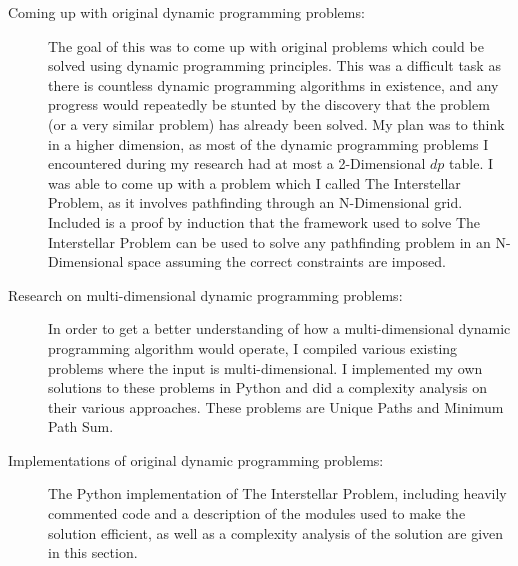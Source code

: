 \begin{description}
    \item[Coming up with original dynamic programming problems:]
    The goal of this was to come up with original problems which could be solved using dynamic programming principles.
    This was a difficult task as there is countless dynamic programming algorithms in existence,
    and any progress would repeatedly be stunted by the discovery that the problem (or a very similar problem) has already been solved.
    My plan was to think in a higher dimension, as most of the dynamic programming problems I encountered during my research had at most a 2-Dimensional $dp$ table.
    I was able to come up with a problem which I called The Interstellar Problem, as it involves pathfinding through an N-Dimensional grid.
    Included is a proof by induction that the framework used to solve The Interstellar Problem can be used to solve any pathfinding problem in an N-Dimensional space assuming the correct constraints are imposed.
    
    \item[Research on multi-dimensional dynamic programming problems:]
    In order to get a better understanding of how a multi-dimensional dynamic programming algorithm would operate,
    I compiled various existing problems where the input is multi-dimensional.
    I implemented my own solutions to these problems in Python and did a complexity analysis on their various approaches.
    These problems are Unique Paths and Minimum Path Sum.
    
    \item[Implementations of original dynamic programming problems:]
    The Python implementation of The Interstellar Problem, including heavily commented code and a description of the modules used to make the solution efficient, as well as a complexity analysis of the solution are given in this section.
        
\end{description}


